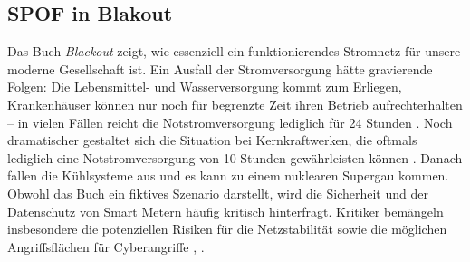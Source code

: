 \documentclass[a4paper,12pt]{article}
\begin{document}
\subsection{SPOF in Blakout}
Das Buch \textit{Blackout} zeigt, wie essenziell ein funktionierendes Stromnetz für unsere moderne Gesellschaft ist. Ein Ausfall der Stromversorgung hätte gravierende Folgen: Die Lebensmittel- und Wasserversorgung kommt zum Erliegen, Krankenhäuser können nur noch für begrenzte Zeit ihren Betrieb aufrechterhalten – in vielen Fällen reicht die Notstromversorgung lediglich für 24 Stunden \cite{NotstromKrankenhaus}. Noch dramatischer gestaltet sich die Situation bei Kernkraftwerken, die oftmals lediglich eine Notstromversorgung von 10 Stunden gewährleisten können \cite[S. 11, Abschnitt 3.1.(9)]{NotstromAKWs}. Danach fallen die Kühlsysteme aus und es kann zu einem nuklearen Supergau kommen.
Obwohl das Buch ein fiktives Szenario darstellt, wird die Sicherheit und der Datenschutz von Smart Metern häufig kritisch hinterfragt. Kritiker bemängeln insbesondere die potenziellen Risiken für die Netzstabilität sowie die möglichen Angriffsflächen für Cyberangriffe \cite{SmartMeterBlackout}, \cite{SmartMeterSicherheit}.



\end{document}
